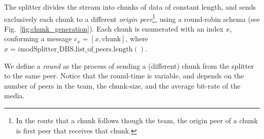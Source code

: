 \label{sec:chunk_generation}

The splitter divides the stream into chunks of data of constant
length, and sends exclusively each chunk to a different \emph{origin
peer}\footnote{In the route that a chunk follows though the team, the
origin peer of a chunk is first peer that receives that chunk.}, using
a round-robin schema (see Fig.~\ref{fig:chunk_generation}). Each chunk
is enumerated with an index $x$, conforming a message
$c_x=[x,\text{chunk}]$, where
$x=i \text{mod} \text{Splitter\_DBS.list\_of\_peers}.\text{length}()$.

\begin{figure*}
  \caption{Chunk generation.\label{fig:chunk_generation}}
\end{figure*}

We define a \emph{round} as the process of sending a (different) chunk
from the splitter to the same peer. Notice that the round-time is
variable, and depends on the number of peers in the team, the
chunk-size, and the average bit-rate of the media.

\begin{comment}
(in a team) as the time necessary to send two
consecutive chunks from the splitter (of such team) to the same peer,
using the round-robing. This time is variable and depends on $|T|$,
$C$, and the average bit-rate of the media, $A$.
\end{comment}

\begin{comment}
The round-time is defined by:
\begin{equation}
  \cal{r} = \cal{c}N.
  \label{eq:round_time}
\end{equation}
For example, if we use only one team of $N=256$ peers, a chunk size
$C=1024$~bytes, and a video of $1$~Mb/s, the round time is
\begin{displaymath}
  \cal{r} = \frac{1024\frac{\text{bytes}}{\text{chunk}}\times
    8\frac{\text{bits}}{\text{byte}}}{10^6\frac{\text{bits}}{\text{second}}}\times
  256 \approx 2.1~\text{seconds}.
\end{displaymath}
\end{comment}
